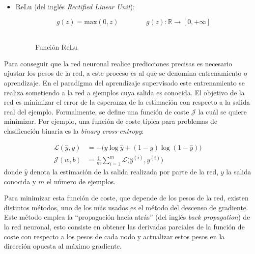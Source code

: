 \begin{itemize}
	\item ReLu (del inglés \textit{Rectified Linear Unit}): 
	
	\begin{equation}
		g(z) = \text{max}(0,z) \qquad\qquad g(z):\mathbb{R} \rightarrow [0,+\infty]
	\end{equation}
\\
	\begin{figure}[htb!]
		\centering
		\caption{Función ReLu}
	\end{figure}
	

\end{itemize} 
  
 Para conseguir que la red neuronal realice predicciones precisas es necesario ajustar los pesos de la red, a este proceso es al que se denomina entrenamiento o aprendizaje. En el paradigma del aprendizaje supervisado este entrenamiento se realiza sometiendo a la red a ejemplos cuya salida es conocida. El objetivo de la red es minimizar el error de la esperanza de la estimación con respecto a la salida real del ejemplo. Formalmente, se define una función de coste $\mathcal{J}$ la cuál se quiere minimizar. Por ejemplo, una función de coste típica para problemas de clasificación binaria es la \textit{binary cross-entropy}:
 
 \begin{align}
 \mathcal{L}(\hat{y},y)&=-\big(y\log\hat{y} + (1-y)\log(1-\hat{y})\big)\\ 
 \mathcal{J}(w,b)&=\frac{1}{m}\sum_{i=1}^{m}{\mathcal{L}\big(\hat{y}^{(i)},{y}^{(i)}\big)}
 \end{align}
 donde $\hat{y}$ denota la estimación de la salida realizada por parte de la red, $y$ la salida conocida y $m$ el número de ejemplos. 
 
 Para minimizar esta función de coste, que depende de los pesos de la red, existen distintos métodos, uno de los más usados es el método del descenso de gradiente. Este método emplea la ``propagación hacia atrás'' (del inglés \textit{back propagation}) de la red neuronal, esto consiste en obtener las derivadas parciales de la función de coste con respecto a los pesos de cada nodo y actualizar estos pesos en la dirección opuesta al máximo gradiente.
 
